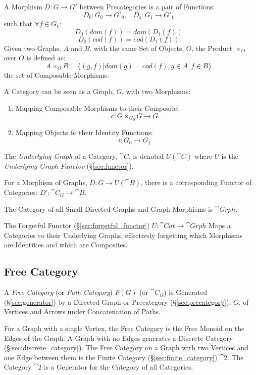 A Morphism $D : G \rightarrow G'$ between Precategories is a pair of Functions:
\[
  D_0 : G_0 \rightarrow G'_0, \;\;\; D_1 : G_1 \rightarrow G'_1
\]
such that $\forall f \in G_1$:
\[
  D_0(dom(f)) = dom(D_1(f))
\]\[
  D_0(cod(f)) = cod(D_1(f))
\]
Given two Graphs, $A$ and $B$, with the same Set of Objects, $O$, the Product
$\times_O$ over $O$ is defined as:
\[
  A \times_O B = \{ (g,f) | dom(g) = cod(f), g \in A, f \in B \}
\]
the set of Composable Morphisms.

A Category can be seen as a Graph, $G$, with two Morphisms:
\begin{enumerate}
  \item Mapping Composable Morphisms to their Composite:
    \[c : G \times_{G_0} G \rightarrow G\]
  \item Mapping Objects to their Identity Functions:
    \[i: G_0 \rightarrow G_1\]
\end{enumerate}
The \emph{Underlying Graph} of a Category, $\cat{C}$, is denoted
$U(\cat{C})$ where $U$ is the \emph{Underlying Graph Functor}
(\S\ref{sec:functor}).

For a Morphism of Graphs, $D : G \rightarrow U(\cat{B})$, there is
a corresponding Functor of Categories: $D' : \cat{C}_G \rightarrow
\cat{B}$.

The Category of all Small Directed Graphs and Graph Morphisms is
$\cat{Grph}$.

The Forgetful Functor (\S\ref{sec:forgetful_functor}) $U : \cat{Cat}
\rightarrow \cat{Grph}$ Maps a Categories to their Underlying Graphs,
effectively forgetting which Morphisms are Identities and which are
Composites.



\subsection{Free Category}\label{sec:free_category}

A \emph{Free Category} (or \emph{Path Category}) $F(G)$ (or
$\cat{C}_G$) is Generated (\S\ref{sec:generator}) by a Directed Graph
or Precategory (\S\ref{sec:precategory}), $G$, of Vertices and Arrows
under Concatenation of Paths.

For a Graph with a single Vertex, the Free Category is the Free Monoid
on the Edges of the Graph. A Graph with no Edges generates a Discrete
Category (\S\ref{sec:discrete_category}). The Free Category on a Graph
with two Vertices and one Edge between them is the Finite Category
(\S\ref{sec:finite_category}) $\cat{2}$. The Category $\cat{2}$ is a
Generator for the Category of all Categories.

